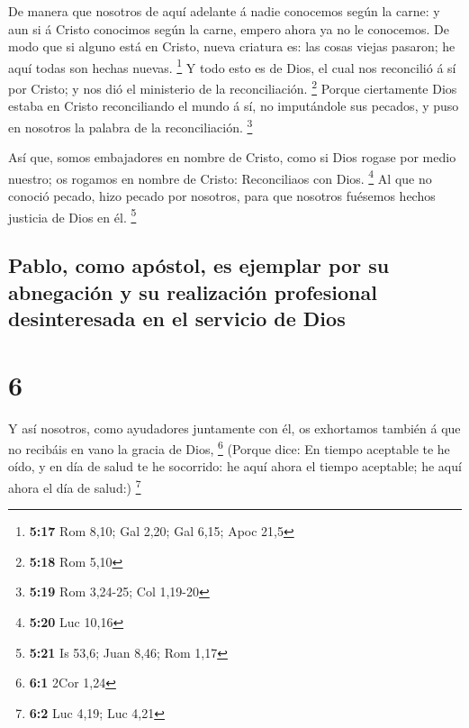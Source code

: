  De manera que nosotros de aquí adelante á nadie conocemos
según la carne: y aun si á Cristo conocimos según la carne, empero ahora
ya no le conocemos.  De modo que si alguno está en Cristo,
nueva criatura es: las cosas viejas pasaron; he aquí todas son hechas
nuevas. \footnote{\textbf{5:17} Rom 8,10; Gal 2,20; Gal 6,15; Apoc 21,5}
 Y todo esto es de Dios, el cual nos reconcilió á sí por
Cristo; y nos dió el ministerio de la reconciliación. \footnote{\textbf{5:18}
  Rom 5,10}  Porque ciertamente Dios estaba en Cristo
reconciliando el mundo á sí, no imputándole sus pecados, y puso en
nosotros la palabra de la reconciliación. \footnote{\textbf{5:19} Rom
  3,24-25; Col 1,19-20}

 Así que, somos embajadores en nombre de Cristo, como si
Dios rogase por medio nuestro; os rogamos en nombre de Cristo:
Reconciliaos con Dios. \footnote{\textbf{5:20} Luc 10,16} 
Al que no conoció pecado, hizo pecado por nosotros, para que nosotros
fuésemos hechos justicia de Dios en él. \footnote{\textbf{5:21} Is 53,6;
  Juan 8,46; Rom 1,17}

\hypertarget{pablo-como-apuxf3stol-es-ejemplar-por-su-abnegaciuxf3n-y-su-realizaciuxf3n-profesional-desinteresada-en-el-servicio-de-dios}{%
\subsection{Pablo, como apóstol, es ejemplar por su abnegación y su
realización profesional desinteresada en el servicio de
Dios}\label{pablo-como-apuxf3stol-es-ejemplar-por-su-abnegaciuxf3n-y-su-realizaciuxf3n-profesional-desinteresada-en-el-servicio-de-dios}}

\hypertarget{section-5}{%
\section{6}\label{section-5}}

 Y así nosotros, como ayudadores juntamente con él, os
exhortamos también á que no recibáis en vano la gracia de Dios,
\footnote{\textbf{6:1} 2Cor 1,24}  (Porque dice: En tiempo
aceptable te he oído, y en día de salud te he socorrido: he aquí ahora
el tiempo aceptable; he aquí ahora el día de salud:) \footnote{\textbf{6:2}
  Luc 4,19; Luc 4,21}

